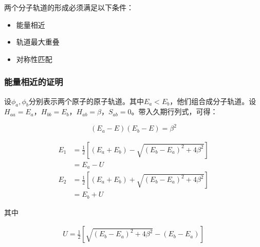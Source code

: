 两个分子轨道的形成必须满足以下条件：

\begin{itemize}
    \item 能量相近
    \item 轨道最大重叠
    \item 对称性匹配
\end{itemize}


\subsubsection{能量相近的证明}

设$\phi_a, \phi_b$分别表示两个原子的原子轨道。其中$E_a < E_b$，他们组合成分子轨道。设$H_{aa} = E_a$，$H_{bb} = E_b$，$H_{ab} = \beta$，$S_{ab} = 0$。带入久期行列式，可得：

\begin{equation*}
    (E_a - E)(E_b - E) = \beta^2
\end{equation*}

\begin{align*}
    E_1 &= \frac{1}{2} \left[ (E_a + E_b) - \sqrt{\left(  E_b - E_a \right)^2 + 4\beta^2}  \right] \\ 
    &= E_a - U
\end{align*}
\begin{align*}
    E_2 &= \frac{1}{2} \left[ (E_a + E_b) + \sqrt{\left(  E_b - E_a \right)^2 + 4\beta^2}  \right] \\ 
    &= E_b + U
\end{align*}

其中

\begin{align*}
    U = \frac{1}{2} \left[ \sqrt{ \left(E_b - E_a\right)^2 + 4\beta^2} - \left(E_b - E_a\right) \right]
\end{align*}

